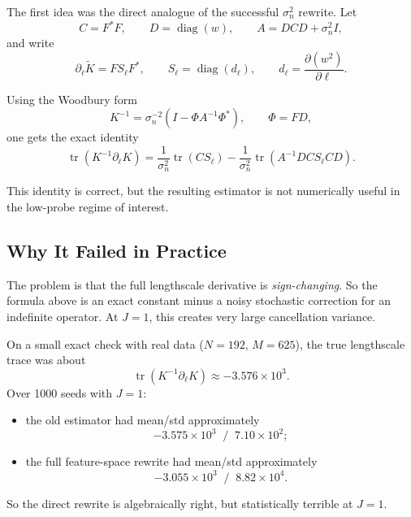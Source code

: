 \documentclass[11pt]{article}
\begin{document}
The first idea was the direct analogue of the successful $\sigma_n^2$ rewrite.
Let
\begin{equation}
C = F^\ast F,
\qquad
D = \operatorname{diag}(w),
\qquad
A = D C D + \sigma_n^2 I,
\end{equation}
and write
\begin{equation}
\partial_\ell \widetilde K = F S_\ell F^\ast,
\qquad
S_\ell = \operatorname{diag}(d_\ell),
\qquad
d_\ell = \frac{\partial (w^2)}{\partial \ell}.
\end{equation}

Using the Woodbury form
\begin{equation}
K^{-1}
=
\sigma_n^{-2}\left(I - \Phi A^{-1}\Phi^\ast\right),
\qquad
\Phi = F D,
\end{equation}
one gets the exact identity
\begin{equation}
\operatorname{tr}\!\left(K^{-1}\partial_\ell K\right)
=
\frac{1}{\sigma_n^2}\operatorname{tr}(C S_\ell)
-
\frac{1}{\sigma_n^2}
\operatorname{tr}\!\left(A^{-1} D C S_\ell C D\right).
\end{equation}

This identity is correct, but the resulting estimator is not numerically useful
in the low-probe regime of interest.

\subsection*{Why It Failed in Practice}

The problem is that the full lengthscale derivative is \emph{sign-changing}.
So the formula above is an exact constant minus a noisy stochastic correction
for an indefinite operator. At $J=1$, this creates very large cancellation
variance.

On a small exact check with real data ($N=192$, $M=625$), the true lengthscale
trace was about
\[
\operatorname{tr}\!\left(K^{-1}\partial_\ell K\right) \approx -3.576\times 10^3.
\]
Over 1000 seeds with $J=1$:
\begin{itemize}
  \item the old estimator had mean/std approximately
  \[
    -3.575\times 10^3 \;\; / \;\; 7.10\times 10^2;
  \]
  \item the full feature-space rewrite had mean/std approximately
  \[
    -3.055\times 10^3 \;\; / \;\; 8.82\times 10^4.
  \]
\end{itemize}

So the direct rewrite is algebraically right, but statistically terrible at
$J=1$.
\end{document}
